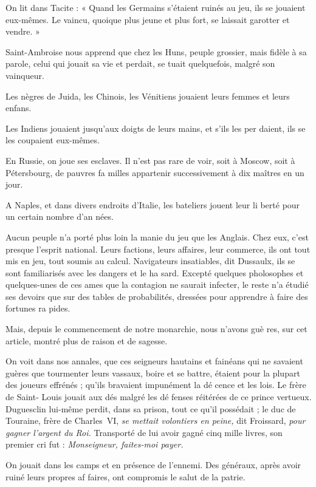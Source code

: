 On lit dans Tacite : « Quand les
Germains s'étaient ruinés au jeu,
ils se jouaient eux-mêmes. Le
vaincu, quoique plus jeune et plus
fort, se laissait garotter et vendre. »

Saint-Ambroise nous apprend que
chez les Huns, peuple grossier, mais
fidèle à sa parole, celui qui jouait sa
vie et perdait, se tuait quelquefois,
malgré son vainqueur.

Les nègres de Juida, les Chinois,
les Vénitiens jouaient leurs femmes
et leurs enfans.

Les Indiens jouaient jusqu'aux
doigts de leurs mains, et s'ils les per%
daient, ils se les coupaient eux-mêmes.

En Russie, on joue ses esclaves. Il
n'est pas rare de voir, soit à Moscow,
soit à Pétersbourg, de pauvres fa%
milles appartenir successivement à
dix maîtres en un jour.

A Naples, et dans divers endroits
d'Italie, les bateliers jouent leur li%
berté pour un certain nombre d'an%
nées.

Aucun peuple n'a porté plus loin
la manie du jeu que les Anglais. Chez
eux, c'est presque l'esprit national.
Leurs factions, leurs affaires, leur
commerce, ils ont tout mis en jeu,
tout soumis au calcul. Navigateurs
insatiables, dit Dussaulx, ils se sont
familiarisés avec les dangers et le ha%
sard. Excepté quelques pholosophes
et quelques-unes de ces ames que la
contagion ne saurait infecter, le reste
n'a étudié ses devoirs que sur des
tables de probabilités, dressées pour
apprendre à faire des fortunes ra%
pides.

Mais, depuis le commencement de
notre monarchie, nous n'avons guè%
res, sur cet article, montré plus de
raison et de sagesse.

On voit dans nos annales, que ces
seigneurs hautains et fainéans qui ne
savaient guères que tourmenter leurs
vassaux, boire et se battre, étaient
pour la plupart des joueurs effrénés ;
qu'ils bravaient impunément la dé%
cence et les lois. Le frère de Saint-%
Louis jouait aux dés malgré les dé%
fenses réitérées de ce prince vertueux.
Duguesclin lui-même perdit, dans sa
prison, tout ce qu'il possédait ; le
duc de Touraine, frère de Charles~VI,
\emph{se mettait volontiers en peine,} dit
Froissard, \emph{pour gagner l'argent du
Roi.} Transporté de lui avoir gagné
cinq mille livres, son premier cri fut :
\emph{Monseigneur, faites-moi payer.}

On jouait dans les camps et en
présence de l'ennemi. Des généraux,
après avoir ruiné leurs propres af%
faires, ont compromis le salut de la
patrie.


